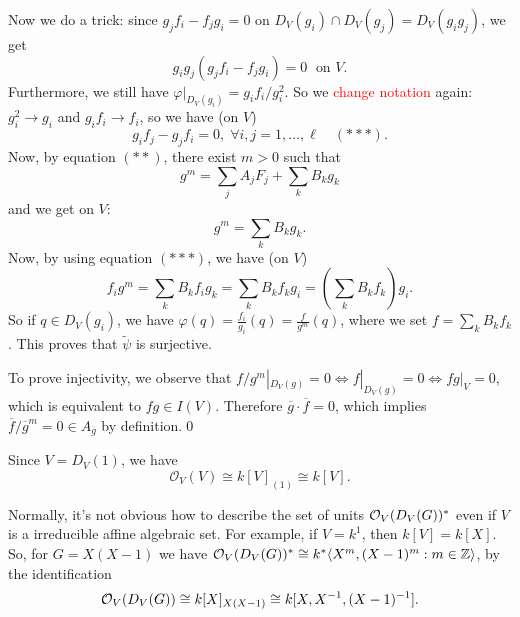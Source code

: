 Now we do a trick: since $g_jf_i - f_jg_i = 0$ on $D_V(g_i)\cap D_V(g_j)=D_V(g_ig_j)$, we get 
\begin{equation}
    g_ig_j(g_jf_i-f_jg_i) = 0\;\text{ on }V.
\end{equation}
Furthermore, we still have $\varphi\big|_{D_V(g_i)}=g_if_i / g_i^2$.
So we \textcolor{red}{change notation} again: $g_i^2\to g_i$ and $g_if_i\to f_i$, so we have (on $V$)
\begin{equation}
    g_if_j - g_jf_i = 0,\;\forall i,j=1,\dots,\ell\quad (***).
\end{equation}
Now, by equation $(**)$, there exist $m>0$ such that 
\begin{equation}
    g^m = \sum_jA_jF_j + \sum_kB_kg_k 
\end{equation}
and we get on $V$:
\begin{equation}
    g^m = \sum_k B_kg_k.
\end{equation}
Now, by using equation $(***)$, we have (on $V$)
\begin{equation}
    f_ig^m = \sum_kB_kf_ig_k = \sum_kB_kf_kg_i = (\sum_kB_kf_k)g_i.
\end{equation}
So if $q\in D_V(g_i)$, we have $\varphi(q) = \tfrac{f_i}{g_i}(q)=\tfrac{f}{g^m}(q)$, where we set $f=\sum_kB_kf_k$. 
This proves that $\widetilde{\psi}$ is surjective.\par 

To prove injectivity, we observe that 
$f/g^m|_{D_V(g)}=0\iff f|_{D_V(g)}=0\iff fg |_V=0$, which is equivalent to $fg\in I(V)$. 
Therefore $\overline{g}\cdot\overline{f}=0$, which implies $\overline{f}/\overline{g}^m=0\in A_{\overline{g}}$ by definition.\qed

\begin{dang}
    \begin{corollary}
        Since $V=D_V(1)$, we have 
        \begin{equation}
            \mathcal{O}_V(V)\cong k[V]_{(1)}\cong k[V].
        \end{equation}
    \end{corollary}
\end{dang}


\begin{dang}
    \begin{remark}
    Normally, it's not obvious how to describe the set of units $\mathcal{O}_V(D_V(G))^*$ even if $V$ is a 
    irreducible affine algebraic set. For example, if $V=k^1$, then $k[V]=k[X]$. So, for $G=X(X-1)$ we have 
    $\mathcal{O}_V(D_V(G))^*\cong k^*\langle X^m, (X-1)^m: m\in\mathbb{Z}\rangle$, by the identification
    \begin{equation}
        \mathcal{O}_V(D_V(G))\cong k[X]_{X(X-1)}\cong k[X,X^{-1},(X-1)^{-1}].
    \end{equation}
\end{remark}
\end{dang}



